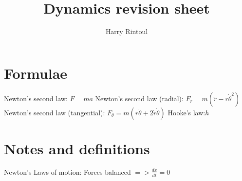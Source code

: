 \documentclass{article}
\title{Dynamics revision sheet}
\author{Harry Rintoul}
\date{}
\begin{document}
\maketitle


\section{Formulae}
\begin{multicols}{2}
Newton's second law: $F = ma$
\newline
Newton's second law (radial): $ F_r = m(\ddot{r} -r \dot{\theta}^2)$
\newline
Newton's second law (tangential): $F_{\theta} = m(r\ddot{\theta}+2\dot{r}\dot{\theta})$
\newline
Hooke's law:$h$
\end{multicols}


\section{Notes and definitions}
Newton's Laws of motion:
\newline
Forces balanced $=>\frac{dx}{dt} = 0$
\end{document}
